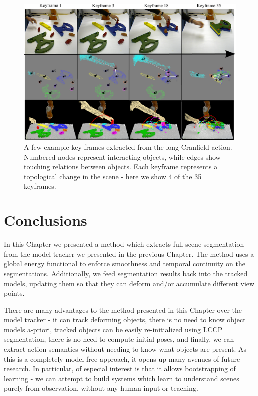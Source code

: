\begin{figure}[ht!]
  \centering
  \includegraphics[width=\linewidth]{figures/IROS2013/SECKF.pdf}
  \caption[Cranfield Key Frames]{A few example key frames extracted from the long Cranfield action. Numbered nodes represent interacting objects, while edges show touching relations between objects. Each keyframe represents a topological change in the scene - here we show 4 of the 35 keyframes.}
  \label{fig:SECGraphs}
\end{figure}

\section{Conclusions}
In this Chapter we presented a method which extracts full scene segmentation from the model tracker we presented in the previous Chapter. The method uses a global energy functional to enforce smoothness and temporal continuity on the segmentations. Additionally, we feed segmentation results back into the tracked models, updating them so that they can deform and/or accumulate different view points. 

There are many advantages to the method presented in this Chapter over the model tracker - it can track deforming objects, there is no need to know object models a-priori, tracked objects can be easily re-initialized using LCCP segmentation, there is no need to compute initial poses, and finally, we can extract action semantics without needing to know what objects are present. As this is a completely model free approach, it opens up many avenues of future research. In particular, of especial interest is that it allows bootstrapping of learning - we can attempt to build systems which learn to understand scenes purely from observation, without any human input or teaching.